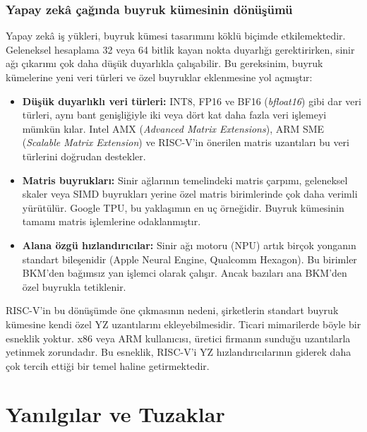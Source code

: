 \subsubsection*{Yapay zekâ çağında buyruk kümesinin dönüşümü}
Yapay zekâ iş yükleri, buyruk kümesi tasarımını köklü biçimde etkilemektedir. Geleneksel hesaplama 32 veya 64 bitlik kayan nokta duyarlığı gerektirirken, sinir ağı çıkarımı çok daha düşük duyarlıkla çalışabilir. Bu gereksinim, buyruk kümelerine yeni veri türleri ve özel buyruklar eklenmesine yol açmıştır:

\begin{itemize}[nosep]
\item \textbf{Düşük duyarlıklı veri türleri:} INT8, FP16 ve BF16 (\emph{bfloat16}) gibi dar veri türleri, aynı bant genişliğiyle iki veya dört kat daha fazla veri işlemeyi mümkün kılar. Intel AMX (\emph{Advanced Matrix Extensions}), ARM SME (\emph{Scalable Matrix Extension}) ve RISC-V'in önerilen matris uzantıları bu veri türlerini doğrudan destekler.
\item \textbf{Matris buyrukları:} Sinir ağlarının temelindeki matris çarpımı, geleneksel skaler veya SIMD buyrukları yerine özel matris birimlerinde çok daha verimli yürütülür. Google TPU, bu yaklaşımın en uç örneğidir. Buyruk kümesinin tamamı matris işlemlerine odaklanmıştır.
\item \textbf{Alana özgü hızlandırıcılar:} Sinir ağı motoru (NPU) artık birçok yonganın standart bileşenidir (Apple Neural Engine, Qualcomm Hexagon). Bu birimler BKM'den bağımsız yan işlemci olarak çalışır. Ancak bazıları ana BKM'den özel buyrukla tetiklenir.
\end{itemize}

RISC-V'in bu dönüşümde öne çıkmasının nedeni, şirketlerin standart buyruk kümesine kendi özel YZ uzantılarını ekleyebilmesidir. Ticari mimarilerde böyle bir esneklik yoktur. x86 veya ARM kullanıcısı, üretici firmanın sunduğu uzantılarla yetinmek zorundadır. Bu esneklik, RISC-V'i YZ hızlandırıcılarının giderek daha çok tercih ettiği bir temel haline getirmektedir.


\section{Yanılgılar ve Tuzaklar}
\label{sec:buyruk-yanilgilar}


